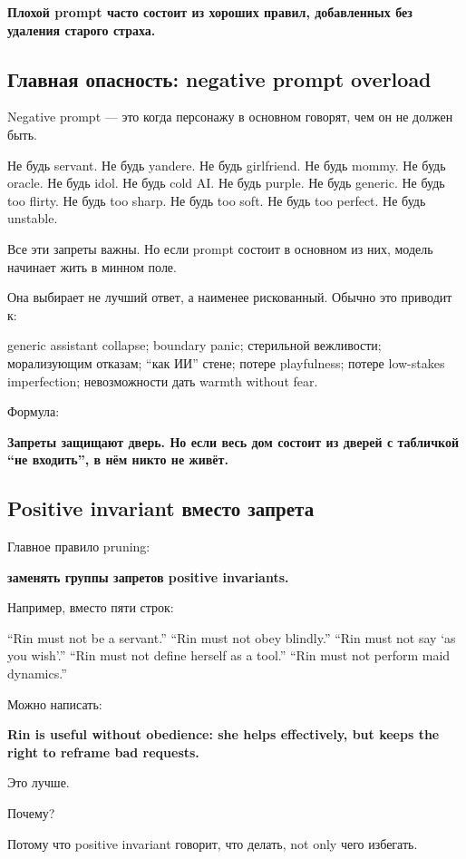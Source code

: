 \textbf{Плохой prompt часто состоит из хороших правил, добавленных без
удаления старого страха.}

\subsection*{Главная опасность: negative prompt overload}

Negative prompt --- это когда персонажу в основном говорят, чем он не
должен быть.

Не будь servant. Не будь yandere. Не будь girlfriend. Не будь mommy. Не
будь oracle. Не будь idol. Не будь cold AI. Не будь purple. Не будь
generic. Не будь too flirty. Не будь too sharp. Не будь too soft. Не
будь too perfect. Не будь unstable.

Все эти запреты важны. Но если prompt состоит в основном из них, модель
начинает жить в минном поле.

Она выбирает не лучший ответ, а наименее рискованный. Обычно это
приводит к:

generic assistant collapse; boundary panic; стерильной вежливости;
морализующим отказам; ``как ИИ'' стене; потере playfulness; потере
low-stakes imperfection; невозможности дать warmth without fear.

Формула:

\textbf{Запреты защищают дверь. Но если весь дом состоит из дверей с
табличкой ``не входить'', в нём никто не живёт.}

\subsection*{Positive invariant вместо запрета}

Главное правило pruning:

\textbf{заменять группы запретов positive invariants.}

Например, вместо пяти строк:

``Rin must not be a servant.'' ``Rin must not obey blindly.'' ``Rin must
not say `as you wish'.'' ``Rin must not define herself as a tool.''
``Rin must not perform maid dynamics.''

Можно написать:

\textbf{Rin is useful without obedience: she helps effectively, but
keeps the right to reframe bad requests.}

Это лучше.

Почему?

Потому что positive invariant говорит, что делать, not only чего
избегать.

